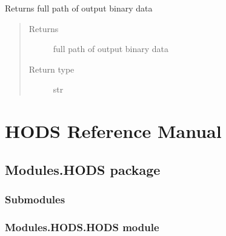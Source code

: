 \documentclass[letterpaper,10pt,english]{sphinxmanual}
\begin{document}
\begin{fulllineitems}

\begin{fulllineitems}
\label{\detokenize{MouseReferenceManual:Modules.Base.ParameterEstimationModuleBaseClass.outputFileName}}
Returns full path of output binary data
\begin{quote}\begin{description}
\item[{Returns}] \leavevmode
full path of output binary data

\item[{Return type}] \leavevmode
str

\end{description}\end{quote}

\end{fulllineitems}


\end{fulllineitems}



\chapter{HODS Reference Manual}
\label{\detokenize{HodsReferenceManual::doc}}\label{\detokenize{HodsReferenceManual:hods-reference-manual}}

\section{Modules.HODS package}
\label{\detokenize{HodsReferenceManual:modules-hods-package}}

\subsection{Submodules}
\label{\detokenize{HodsReferenceManual:submodules}}

\subsection{Modules.HODS.HODS module}
\label{\detokenize{HodsReferenceManual:module-Modules.HODS.HODS}}\label{\detokenize{HodsReferenceManual:modules-hods-hods-module}}
\end{document}
